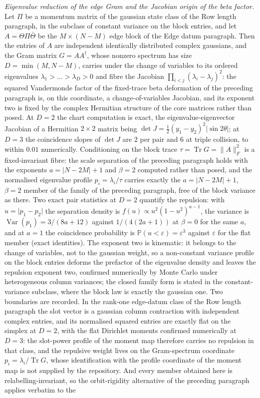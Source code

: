 \emph{Eigenvalue reduction of the edge Gram and the Jacobian origin of the beta factor.} Let \(\Pi\) be a momentum matrix of the gaussian state class of the Row length paragraph, in the subclass of constant variance on the block entries, and let \(A=\Theta\Pi\bar\Theta\) be the \(M\times(N-M)\) edge block of the Edge datum paragraph. Then the entries of \(A\) are independent identically distributed complex gaussians, and the Gram matrix \(G=AA^{\dagger}\), whose nonzero spectrum has size \(D=\min(M,N-M)\), carries under the change of variables to its ordered eigenvalues \(\lambda_{1}>\dots>\lambda_{D}>0\) and fibre the Jacobian \(\prod_{i<j}(\lambda_{i}-\lambda_{j})^{2}\): the squared Vandermonde factor of the fixed-trace beta deformation of the preceding paragraph is, on this coordinate, a change-of-variables Jacobian, and its exponent two is fixed by the complex Hermitian structure of the core matrices rather than posed. At \(D=2\) the chart computation is exact, the eigenvalue-eigenvector Jacobian of a Hermitian \(2\times2\) matrix being \(\det J=\tfrac{1}{2}(y_{1}-y_{2})^{2}\lvert\sin 2\theta\rvert\); at \(D=3\) the coincidence slopes of \(\det J\) are \(2\) per pair and \(6\) at triple collision, to within \(0.01\) numerically. Conditioning on the block trace \(\tau=\operatorname{Tr}G=\lVert A\rVert_{F}^{2}\) is a fixed-invariant fibre: the scale separation of the preceding paragraph holds with the exponents \(a=\lvert N-2M\rvert+1\) and \(\beta=2\) computed rather than posed, and the normalised eigenvalue profile \(p_{i}=\lambda_{i}/\tau\) carries exactly the \(a=\lvert N-2M\rvert+1\), \(\beta=2\) member of the family of the preceding paragraph, free of the block variance as there. Two exact pair statistics at \(D=2\) quantify the repulsion: with \(u=\lvert p_{1}-p_{2}\rvert\) the separation density is \(f(u)\propto u^{2}(1-u^{2})^{a-1}\), the variance is \(\operatorname{Var}(p_{1})=3/(8a+12)\) against \(1/(4(2a+1))\) at \(\beta=0\) for the same \(a\), and at \(a=1\) the coincidence probability is \(\mathbb{P}(u<\varepsilon)=\varepsilon^{3}\) against \(\varepsilon\) for the flat member (exact identities). The exponent two is kinematic: it belongs to the change of variables, not to the gaussian weight, so a non-constant variance profile on the block entries deforms the prefactor of the eigenvalue density and leaves the repulsion exponent two, confirmed numerically by Monte Carlo under heterogeneous column variances; the closed family form is stated in the constant-variance subclass, where the block law is exactly the gaussian one. Two boundaries are recorded. In the rank-one edge-datum class of the Row length paragraph the slot vector is a gaussian column contraction with independent complex entries, and its normalised squared entries are exactly flat on the simplex at \(D=2\), with the flat Dirichlet moments confirmed numerically at \(D=3\): the slot-power profile of the moment map therefore carries no repulsion in that class, and the repulsive weight lives on the Gram-spectrum coordinate \(p_{i}=\lambda_{i}/\operatorname{Tr}G\), whose identification with the profile coordinate of the moment map is not supplied by the repository. And every member obtained here is relabelling-invariant, so the orbit-rigidity alternative of the preceding paragraph applies verbatim to the 